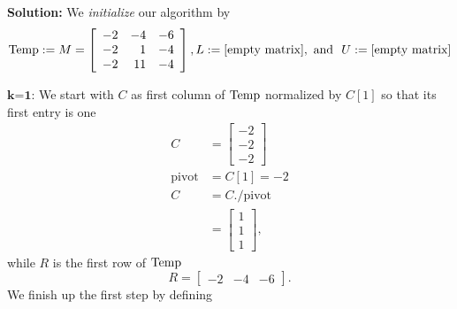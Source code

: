 \textbf{Solution:} We \textit{initialize} our algorithm by $${\rm Temp}:= M = \left[\begin{array}{rrr} -2 & -4 & -6\\
-2 & 1 & -4 \\ -2 & 11 & -4 \end{array}\right], L:=[\textrm{empty matrix}],~\text{and}~~ U:=[\textrm{empty matrix}]$$


$\textbf{k=1:}$ We start with $C$ as first column of ${\rm Temp}$ normalized by $C[1]$ so that its first entry is one
\begin{align*}C &=\left[\begin{array}{r} -2 \\ -2 \\ -2 \end{array} \right]\\
\textrm{pivot}&=C[1] = -2\\
C&=C. \slash \textrm{pivot} \\
&= \left[\begin{array}{r} 1 \\ 1 \\1 \end{array} \right],
\end{align*}
while $R$ is the first row of  ${\rm Temp}$ 
$$ R = \left[\begin{array}{rrr} -2&-4 & -6 \end{array} \right].$$
We finish up the first step by defining
